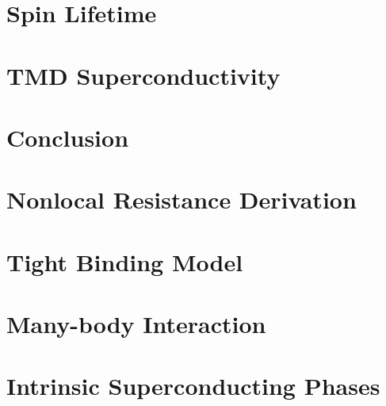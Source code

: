 \documentclass[oneside,12pt]{memoir}
\begin{document}
  \frontmatter{}
  
  
  
  \pagestyle{thesis}
  
  
  
  \newpage
  \tableofcontents
  \newpage
  \listoffigures
  \mainmatter{}
  

  \chapter{Spin Lifetime}\label{s:spin-lifetime}
  
  
  
  

  \chapter{TMD Superconductivity}\label{s:dichalcogenides}
  
  
  
  
  

  \chapter{Conclusion}
  

  \begin{appendices}

    \chapter{Nonlocal Resistance Derivation}
    

    \chapter{Tight Binding Model}
    

    \chapter{Many-body Interaction}
    

    \chapter{Intrinsic Superconducting Phases}
    
  \end{appendices}
  \backmatter{}
  \SingleSpacing{}
  \printbibliography{}
\end{document}
